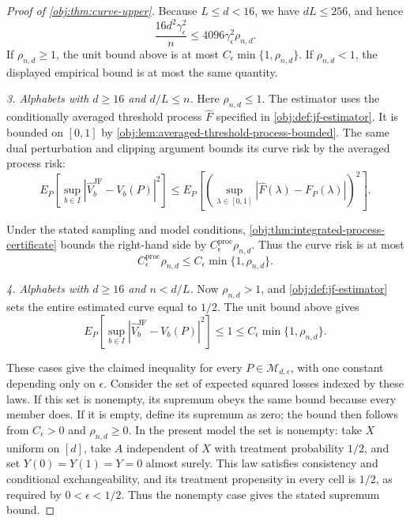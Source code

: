 \documentclass[11pt]{article}
\begin{document}
\begin{proof}[Proof of \cref{obj:thm:curve-upper}]
Because \(L\le d<16\), we have \(dL\le256\), and hence
\[
\frac{16d^2\gamma_\epsilon^2}{n}
\le4096\gamma_\epsilon^2\rho_{n,d}.
\]
If \(\rho_{n,d}\ge1\), the unit bound above is at most \(C_\epsilon\min\{1,\rho_{n,d}\}\). If \(\rho_{n,d}<1\), the displayed empirical bound is at most the same quantity.

\textit{3. Alphabets with \(d\ge16\) and \(d/L\le n\).} Here \(\rho_{n,d}\le1\). The estimator uses the conditionally averaged threshold process \(\widehat F\) specified in \cref{obj:def:jf-estimator}. It is bounded on \([0,1]\) by \cref{obj:lem:averaged-threshold-process-bounded}. The same dual perturbation and clipping argument bounds its curve risk by the averaged process risk:
\[
E_P\!\left[\sup_{b\in I}
 |\widehat V_b^{\mathrm{JF}}-V_b(P)|^2\right]
\le
E_P\!\left[
 \left(\sup_{\lambda\in[0,1]}
 |\widehat F(\lambda)-F_P(\lambda)|\right)^2\right].
\]

Under the stated sampling and model conditions, \cref{obj:thm:integrated-process-certificate} bounds the right-hand side by \(C_\epsilon^{\mathrm{proc}}\rho_{n,d}\). Thus the curve risk is at most
\[
C_\epsilon^{\mathrm{proc}}\rho_{n,d}
\le C_\epsilon\min\{1,\rho_{n,d}\}.
\]

\textit{4. Alphabets with \(d\ge16\) and \(n<d/L\).} Now \(\rho_{n,d}>1\), and \cref{obj:def:jf-estimator} sets the entire estimated curve equal to \(1/2\). The unit bound above gives
\[
E_P\!\left[\sup_{b\in I}
 |\widehat V_b^{\mathrm{JF}}-V_b(P)|^2\right]
\le1\le C_\epsilon\min\{1,\rho_{n,d}\}.
\]

These cases give the claimed inequality for every \(P\in\mathcal M_{d,\epsilon}\), with one constant depending only on \(\epsilon\). Consider the set of expected squared losses indexed by these laws. If this set is nonempty, its supremum obeys the same bound because every member does. If it is empty, define its supremum as zero; the bound then follows from \(C_\epsilon>0\) and \(\rho_{n,d}\ge0\). In the present model the set is nonempty: take \(X\) uniform on \([d]\), take \(A\) independent of \(X\) with treatment probability \(1/2\), and set \(Y(0)=Y(1)=Y=0\) almost surely. This law satisfies consistency and conditional exchangeability, and its treatment propensity in every cell is \(1/2\), as required by \(0<\epsilon<1/2\). Thus the nonempty case gives the stated supremum bound.
\end{proof}
\end{document}
